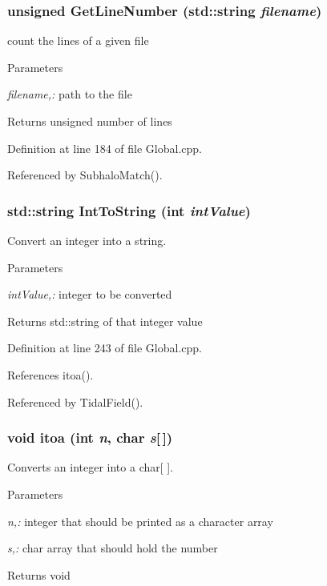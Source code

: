 \subsubsection[{GetLineNumber}]{\setlength{\rightskip}{0pt plus 5cm}unsigned GetLineNumber (std::string {\em filename})}\label{Global_8cpp_a5cf7528ff238e0f7be1d86289650f04e}
count the lines of a given file 
\begin{DoxyParams}{Parameters}
\item[{\em filename,:}]path to the file \end{DoxyParams}
\begin{DoxyReturn}{Returns}
unsigned number of lines 
\end{DoxyReturn}


Definition at line 184 of file Global.cpp.



Referenced by SubhaloMatch().

\subsubsection[{IntToString}]{\setlength{\rightskip}{0pt plus 5cm}std::string IntToString (int {\em intValue})}\label{Global_8cpp_a3d2b4d4a9d8d164a3fdea80bfc1ea93d}
Convert an integer into a string. 
\begin{DoxyParams}{Parameters}
\item[{\em intValue,:}]integer to be converted \end{DoxyParams}
\begin{DoxyReturn}{Returns}
std::string of that integer value 
\end{DoxyReturn}


Definition at line 243 of file Global.cpp.



References itoa().



Referenced by TidalField().

\subsubsection[{itoa}]{\setlength{\rightskip}{0pt plus 5cm}void itoa (int {\em n}, \/  char {\em s}\mbox{[}$\,$\mbox{]})}\label{Global_8cpp_af749add1ff19b6ff96a62f35ebb49b7e}
Converts an integer into a char\mbox{[} \mbox{]}. 
\begin{DoxyParams}{Parameters}
\item[{\em n,:}]integer that should be printed as a character array \item[{\em s,:}]char array that should hold the number \end{DoxyParams}
\begin{DoxyReturn}{Returns}
void 
\end{DoxyReturn}


